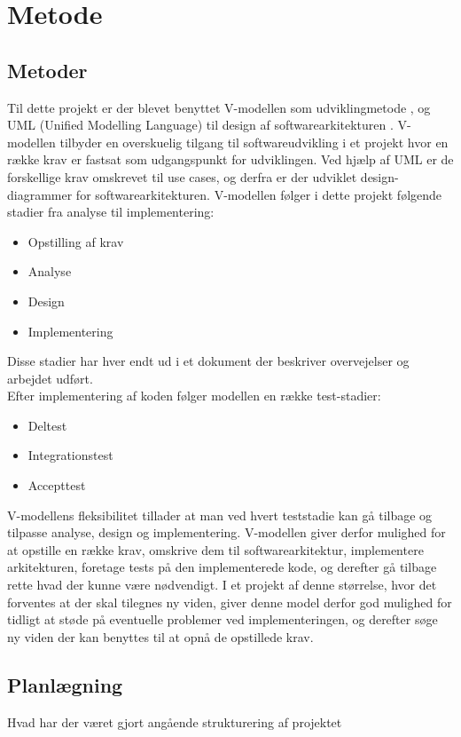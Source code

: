 \documentclass[rapport.tex]{subfiles}
\begin{document}
\section{Metode}
	\subsection{Metoder}
	Til dette projekt er der blevet benyttet V-modellen som udviklingmetode \cite{Vmodel}, og UML (Unified Modelling Language) \cite{UML} til design af softwarearkitekturen . V-modellen tilbyder en overskuelig tilgang til softwareudvikling i et projekt hvor en række krav er fastsat som udgangspunkt for udviklingen. Ved hjælp af UML er de forskellige krav omskrevet til use cases, og derfra er der udviklet design-diagrammer for softwarearkitekturen. 
	V-modellen følger i dette projekt følgende stadier fra analyse til implementering:
	\begin{itemize}
		\item Opstilling af krav
		\item Analyse
		\item Design
		\item Implementering
	\end{itemize}
	Disse stadier har hver endt ud i et dokument der beskriver overvejelser og arbejdet udført. \\
	
	Efter implementering af koden følger modellen en række test-stadier:
	\begin{itemize}
		\item Deltest
		\item Integrationstest
		\item Accepttest
	\end{itemize}
	
	V-modellens fleksibilitet tillader at man ved hvert teststadie kan gå tilbage og tilpasse analyse, design og implementering. 
	V-modellen giver derfor mulighed for at opstille en række krav, omskrive dem til softwarearkitektur, implementere arkitekturen, foretage tests på den implementerede kode, og derefter gå tilbage rette hvad der kunne være nødvendigt. 
	I et projekt af denne størrelse, hvor det forventes at der skal tilegnes ny viden, giver denne model derfor god mulighed for tidligt at støde på eventuelle problemer ved implementeringen, og derefter søge ny viden der kan benyttes til at opnå de opstillede krav. 
	
	\subsection{Planlægning}
	Hvad har der været gjort angående strukturering af projektet
	
\end{document}
